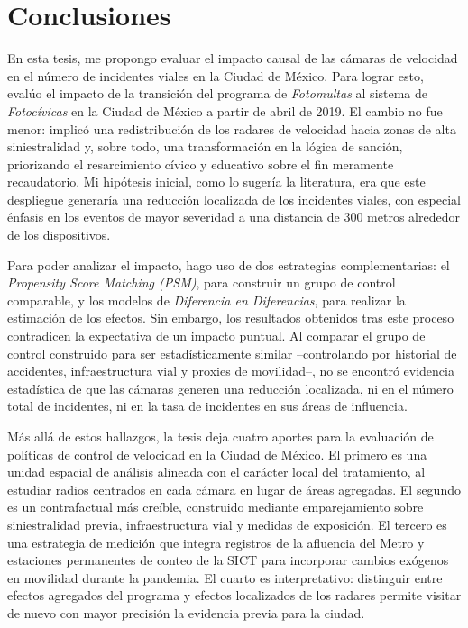 \chapter*{Conclusiones}


\noindent En esta tesis, me propongo evaluar el impacto causal de las cámaras de velocidad en el número de incidentes viales en la Ciudad de México. Para lograr esto, evalúo el impacto de la transición del programa de \textit{Fotomultas} al sistema de \textit{Fotocívicas} en la Ciudad de México a partir de abril de 2019. El cambio no fue menor: implicó una redistribución de los radares de velocidad hacia zonas de alta siniestralidad y, sobre todo, una transformación en la lógica de sanción, priorizando el resarcimiento cívico y educativo sobre el fin meramente recaudatorio. Mi hipótesis inicial, como lo sugería la literatura, era que este despliegue generaría una reducción localizada de los incidentes viales, con especial énfasis en los eventos de mayor severidad a una distancia de 300 metros alrededor de los dispositivos. 

Para poder analizar el impacto, hago uso de dos estrategias complementarias: el \textit{Propensity Score Matching (PSM)}, para construir un grupo de control comparable, y los modelos de \textit{Diferencia en Diferencias}, para realizar la estimación de los efectos. Sin embargo, los resultados obtenidos tras este proceso contradicen la expectativa de un impacto puntual. Al comparar el grupo de control construido para ser estadísticamente similar --controlando por historial de accidentes, infraestructura vial y proxies de movilidad--, no se encontró evidencia estadística de que las cámaras generen una reducción localizada, ni en el número total de incidentes, ni en la tasa de incidentes en sus áreas de influencia. 

Más allá de estos hallazgos, la tesis deja cuatro aportes para la evaluación de políticas de control de velocidad en la Ciudad de México. El primero es una unidad espacial de análisis alineada con el carácter local del tratamiento, al estudiar radios centrados en cada cámara en lugar de áreas agregadas. El segundo es un contrafactual más creíble, construido mediante emparejamiento sobre siniestralidad previa, infraestructura vial y medidas de exposición. El tercero es una estrategia de medición que integra registros de la afluencia del Metro y estaciones permanentes de conteo de la SICT para incorporar cambios exógenos en movilidad durante la pandemia. El cuarto es interpretativo: distinguir entre efectos agregados del programa y efectos localizados de los radares permite visitar de nuevo con mayor precisión la evidencia previa para la ciudad. 

